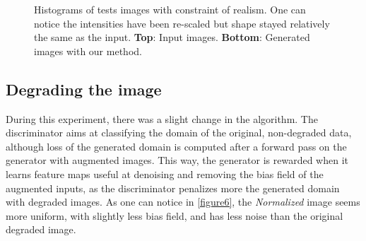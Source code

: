 \documentclass[preprint,12pt]{elsarticle}
\begin{document}
\begin{figure}
\begin{center}
    \begin{footnotesize}
    \end{footnotesize}
    \caption{Histograms of tests images with constraint of realism. One can notice the intensities have been re-scaled but shape stayed relatively the same as the input.  \textbf{Top}: Input images. \textbf{Bottom}: Generated images with our method.}
    \label{figure5}
\end{center}
\end{figure}

\subsection{Degrading the image}

During this experiment, there was a slight change in the algorithm. The discriminator aims at classifying the domain of the original, non-degraded data, although loss of the generated domain is computed after a forward pass on the generator with augmented images. This way, the generator is rewarded when it learns feature maps useful at denoising and removing the bias field of the augmented inputs, as the discriminator penalizes more the generated domain with degraded images. As one can notice in \ref{figure6}, the \emph{Normalized} image seems more uniform, with slightly less bias field, and has less noise than the original degraded image.
\end{document}
